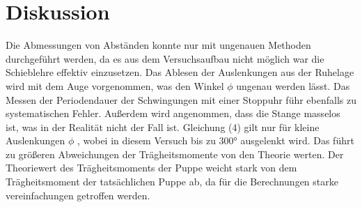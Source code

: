 \section{Diskussion}
\label{sec:Diskussion}
Die Abmessungen von Abständen konnte nur mit ungenauen Methoden durchgeführt werden,
da es aus dem Versuchsaufbau nicht möglich war die Schieblehre effektiv einzusetzen.
Das Ablesen der Auslenkungen aus der Ruhelage wird mit dem Auge vorgenommen, was
den Winkel $\phi$ ungenau werden lässt. Das Messen der Periodendauer der
Schwingungen mit einer Stoppuhr führ ebenfalls zu systematischen Fehler.
Außerdem wird angenommen, dass die Stange masselos ist, was in der Realität
nicht der Fall ist. Gleichung (4) gilt nur für kleine Auslenkungen $\phi$ , wobei
in diesem Versuch bis zu 300° ausgelenkt wird. Das führt zu größeren Abweichungen
der Trägheitsmomente von den Theorie werten. Der Theoriewert des Trägheitsmoments
der Puppe weicht stark von dem Trägheitsmoment der tatsächlichen Puppe ab, da für die
Berechnungen starke vereinfachungen getroffen werden.
